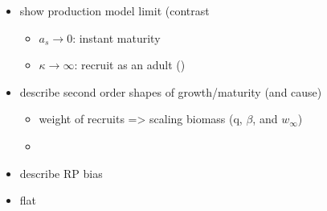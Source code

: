 %
\begin{itemize}
\item show production model limit (contrast %
\begin{itemize}
        \item $a_s\rightarrow0$: instant maturity
        \item $\kappa\rightarrow\infty$: recruit as an adult ()
\end{itemize}
\item describe second order shapes of growth/maturity (and cause)
\begin{itemize}
        \item weight of recruits => scaling biomass (q, $\beta$, and $w_\infty$)
        \item
\end{itemize}
\item describe RP bias
\item flat
\end{itemize}


